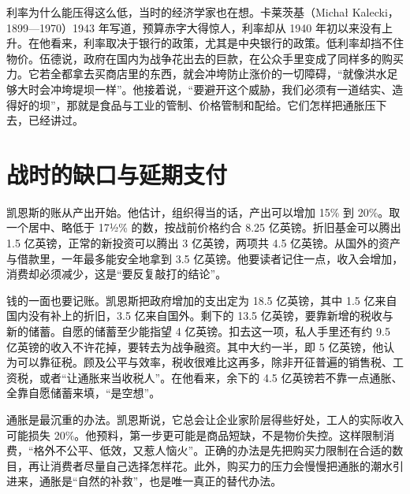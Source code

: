 利率为什么能压得这么低，当时的经济学家也在想。卡莱茨基（Michał Kalecki，1899—1970）1943 年写道，预算赤字大得惊人，利率却从 1940 年初以来没有上升\cite{kalecki1943,bnf32}。在他看来，利率取决于银行的政策，尤其是中央银行的政策\cite{kalecki1943}。低利率却挡不住物价。伍德说，政府在国内为战争花出去的巨款，在公众手里变成了同样多的购买力\cite{hansard1941}。它若全都拿去买商店里的东西，就会冲垮防止涨价的一切障碍，“就像洪水足够大时会冲垮堤坝一样”\cite{hansard1941}。他接着说，“要避开这个威胁，我们必须有一道结实、造得好的坝”，那就是食品与工业的管制、价格管制和配给\cite{hansard1941}。它们怎样把通胀压下去，已经讲过。

\section{战时的缺口与延期支付}\label{sec:warfinance-gap}

凯恩斯的账从产出开始。他估计，组织得当的话，产出可以增加 15\% 到 20\%\cite{keynes1940}。取一个居中、略低于 17½\% 的数，按战前价格约合 8.25 亿英镑\cite{keynes1940}。折旧基金可以腾出 1.5 亿英镑，正常的新投资可以腾出 3 亿英镑，两项共 4.5 亿英镑\cite{keynes1940}。从国外的资产与借款里，一年最多能安全地拿到 3.5 亿英镑\cite{keynes1940}。他要读者记住一点，收入会增加，消费却必须减少，这是“要反复敲打的结论”\cite{keynes1940}。

钱的一面也要记账。凯恩斯把政府增加的支出定为 18.5 亿英镑，其中 1.5 亿来自国内没有补上的折旧，3.5 亿来自国外\cite{keynes1940}。剩下的 13.5 亿英镑，要靠新增的税收与新的储蓄\cite{keynes1940}。自愿的储蓄至少能指望 4 亿英镑。扣去这一项，私人手里还有约 9.5 亿英镑的收入不许花掉，要转去为战争融资\cite{keynes1940}。其中大约一半，即 5 亿英镑，他认为可以靠征税\cite{keynes1940}。顾及公平与效率，税收很难比这再多，除非开征普遍的销售税、工资税，或者“让通胀来当收税人”\cite{keynes1940}。在他看来，余下的 4.5 亿英镑若不靠一点通胀、全靠自愿储蓄来填，“是空想”\cite{keynes1940}。

通胀是最沉重的办法。凯恩斯说，它总会让企业家阶层得些好处，工人的实际收入可能损失 20\%\cite{keynes1940}。他预料，第一步更可能是商品短缺，不是物价失控。这样限制消费，“格外不公平、低效，又惹人恼火”\cite{keynes1940}。正确的办法是先把购买力限制在合适的数目，再让消费者尽量自己选择怎样花\cite{keynes1940}。此外，购买力的压力会慢慢把通胀的潮水引进来，通胀是“自然的补救”，也是唯一真正的替代办法\cite{keynes1940}。


